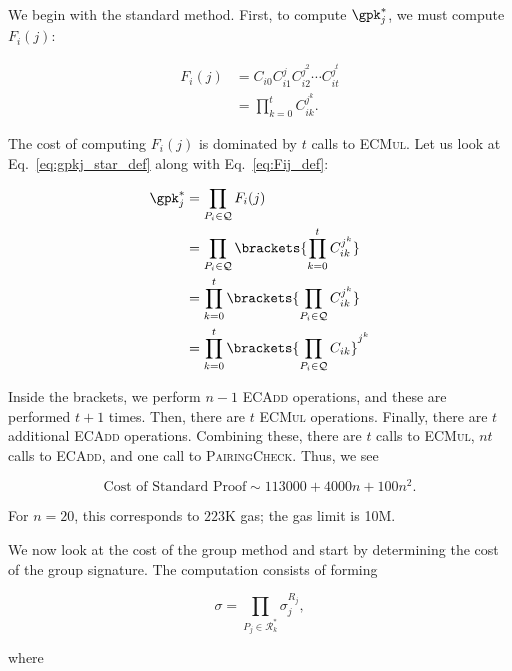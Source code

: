 

We begin with the standard method.
First, to compute $\gpk_{j}^{*}$, we must compute $F_{i}(j)$:

\begin{align}
    F_{i}(j) &= C_{i0}C_{i1}^{j}C_{i2}^{j^{2}}\cdots C_{it}^{j^{t}} \nonumber\\
        &= \prod_{k=0}^{t} C_{ik}^{j^{k}}.
    \label{eq:Fij_def}
\end{align}

\noindent
The cost of computing $F_{i}(j)$ is dominated by $t$ calls to \textsc{ECMul}.
Let us look at Eq.~\eqref{eq:gpkj_star_def} along with Eq.~\eqref{eq:Fij_def}:

\begin{align}
    \gpk_{j}^{*} &= \prod_{P_{i}\in\mathcal{Q}}F_{i}(j) \nonumber\\
        &= \prod_{P_{i}\in\mathcal{Q}}
                \brackets{\prod_{k=0}^{t} C_{ik}^{j^{k}}}
            \nonumber\\
        &= \prod_{k=0}^{t}
            \brackets{\prod_{P_{i}\in\mathcal{Q}} C_{ik}^{j^{k}}} \nonumber\\
        &= \prod_{k=0}^{t}
            \brackets{\prod_{P_{i}\in\mathcal{Q}} C_{ik}}^{j^{k}}
\end{align}

\noindent
Inside the brackets, we perform $n-1$ \textsc{ECAdd} operations,
and these are performed $t+1$ times.
Then, there are $t$ \textsc{ECMul} operations.
Finally, there are $t$ additional \textsc{ECAdd} operations.
Combining these, there are $t$ calls to \textsc{ECMul},
$nt$ calls to \textsc{ECAdd}, and one call to \textsc{PairingCheck}.
Thus, we see

\begin{equation}
    \text{Cost of Standard Proof} \sim 113000 + 4000n + 100n^{2}.
    \label{eq:cost_standard}
\end{equation}

\noindent
For $n=20$, this corresponds to $223$K gas;
the gas limit is 10M.

We now look at the cost of the group method
and start by determining the cost of the group signature.
The computation consists of forming

\begin{equation}
    \sigma = \prod_{P_{j}\in\mathcal{R}^{*}_{k}} \sigma_{j}^{R_{j}},
\end{equation}

\noindent
where

